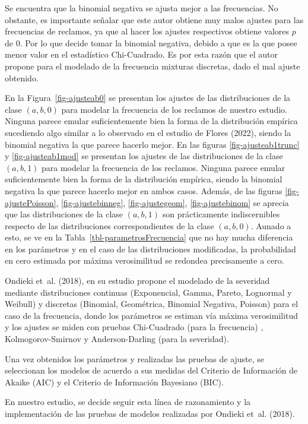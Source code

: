 \documentclass[
  letterpaper,
  onepage,
  openany]{scrreprt}
\begin{document}
Se encuentra que la binomial negativa se ajusta mejor a las frecuencias.
No obstante, es importante señalar que este autor obtiene muy malos
ajustes para las frecuencias de reclamos, ya que al hacer los ajustes
respectivos obtiene valores \(p\) de 0. Por lo que decide tomar la
binomial negativa, debido a que es la que posee menor valor en el
estadístico Chi-Cuadrado. Es por esta razón que el autor propone para el
modelado de la frecuencia mixturas discretas, dado el mal ajuste
obtenido.

En la Figura~\ref{fig-ajusteab0} se presentan los ajustes de las
distribuciones de la clase \((a,b,0)\) para modelar la frecuencia de los
reclamos de nuestro estudio. Ninguna parece emular suficientemente bien
la forma de la distribución empírica sucediendo algo similar a lo
observado en el estudio de Flores (2022), siendo la binomial negativa la
que parece hacerlo mejor. En las figuras \ref{fig-ajusteab1trunc} y
\ref{fig-ajusteab1mod} se presentan los ajustes de las distribuciones de
la clase \((a,b,1)\) para modelar la frecuencia de los reclamos. Ninguna
parece emular suficientemente bien la forma de la distribución empírica,
siendo la binomial negativa la que parece hacerlo mejor en ambos casos.
Además, de las figuras \ref{fig-ajustePoisson}, \ref{fig-ajustebinneg},
\ref{fig-ajustegeom}, \ref{fig-ajustebinom} se aprecia que las
distribuciones de la clase \((a,b,1)\) son prácticamente indiscernibles
respecto de las distribuciones correspondientes de la clase \((a,b,0)\).
Aunado a esto, se ve en la Tabla~\ref{tbl-parametrosFrecuencia} que no
hay mucha diferencia en los parámetros y en el caso de las
distribuciones modificadas, la probabilidad en cero estimada por máxima
verosimilitud se redondea precisamente a cero.

Ondieki et~al. (2018), en su estudio propone el modelado de la severidad
mediante distribuciones continuas (Exponencial, Gamma, Pareto, Lognormal
y Weibull) y discretas (Binomial, Geométrica, Binomial Negativa,
Poisson) para el caso de la frecuencia, donde los parámetros se estiman
vía máxima verosimilitud y los ajustes se miden con pruebas Chi-Cuadrado
(para la frecuencia) , Kolmogorov-Smirnov y Anderson-Darling (para la
severidad).

Una vez obtenidos los parámetros y realizadas las pruebas de ajuste, se
seleccionan los modelos de acuerdo a sus medidas del Criterio de
Información de Akaike (AIC) y el Criterio de Información Bayesiano
(BIC).

En nuestro estudio, se decide seguir esta línea de razonamiento y la
implementación de las pruebas de modelos realizadas por Ondieki et~al.
(2018).
\end{document}
